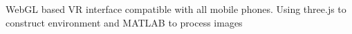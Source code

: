 \begin{cventry}
  \item WebGL based VR interface compatible with all mobile phones. Using three.js to construct environment and MATLAB to process images
\end{cventry}
